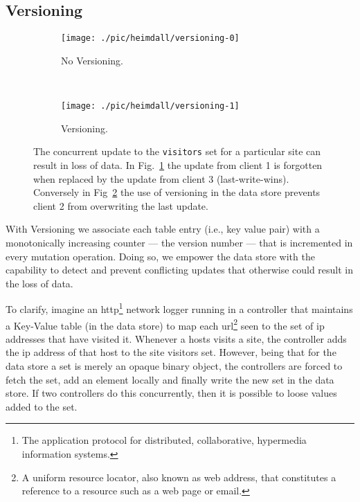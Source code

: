 \subsection {Versioning}
\label{sec:heimdall:versioning}
\begin{figure}[ht]
  \centering
  \begin{subfigure}[b]{0.5\textwidth}
                \centering
                \texttt{[image: ./pic/heimdall/versioning-0]}
                \caption{No Versioning.} 
                \label{fig:heimdall:versioning-0}

        \end{subfigure}
        ~
        \begin{subfigure}[b]{0.5\textwidth}
                \centering
                \texttt{[image: ./pic/heimdall/versioning-1]}
                \caption{Versioning.}
                \label{fig:heimdall:versioning-1}
        \end{subfigure}
  \caption[Concurrent updates]{The concurrent update to the \texttt{visitors} set for a particular site can result in loss of data. In  Fig.~\ref{fig:heimdall:versioning-0} the update from client 1 is forgotten  when replaced by the update from client 3 (last-write-wins).  Conversely in Fig~\ref{fig:heimdall:versioning-1} the use of versioning in the data store prevents client 2 from overwriting the last update.}
\label{fig:heimdall:versioning}
\end{figure}

With Versioning we associate each table entry (i.e., key value pair)  with a monotonically increasing counter --- the version number ---   that is incremented in every mutation operation. 
Doing so, we empower the data store with the capability to detect and prevent conflicting updates that otherwise could result in the loss of data. 

To clarify, imagine an \gls{http}\footnote{The application protocol for distributed, collaborative, hypermedia information systems.} network logger running in a controller that maintains  a Key-Value table  (in the data store) to map each \gls{url}\footnote{A uniform resource locator, also known as web address,  that constitutes a reference to a resource such as a web page or email.} seen to the set of \gls{ip} addresses that have visited it. 
Whenever a hosts visits a site, the controller adds the \gls{ip} address of that host to the site visitors set. 
However, being that  for the data store a set is merely an opaque binary object, the controllers are forced to fetch the set, add an element locally and finally write the new set in the data store. If two controllers do this concurrently, then it is possible to loose values added to the set. 

